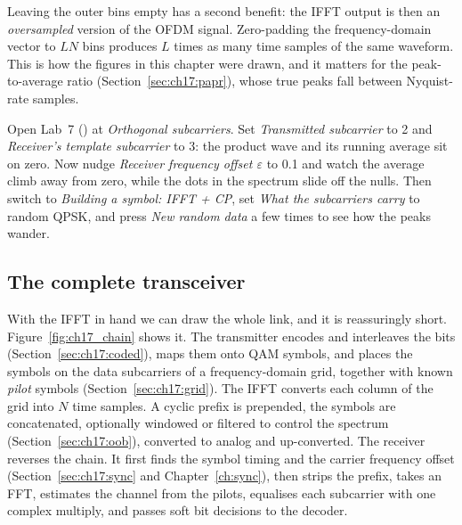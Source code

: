 Leaving the outer bins empty has a second benefit: the IFFT output is then an \emph{oversampled}
version of the OFDM signal. Zero-padding the frequency-domain vector to $LN$ bins produces $L$
times as many time samples of the same waveform. This is how the figures in this chapter were
drawn, and it matters for the peak-to-average ratio (Section~\ref{sec:ch17:papr}), whose true peaks
fall between Nyquist-rate samples.


\begin{tryit}
Open Lab~7 () at \emph{Orthogonal subcarriers}. Set \emph{Transmitted
subcarrier} to 2 and \emph{Receiver's template subcarrier} to 3: the product wave and its
running average sit on zero. Now nudge \emph{Receiver frequency offset $\varepsilon$} to 0.1 and
watch the average climb away from zero, while the dots in the spectrum slide off the nulls.
Then switch to \emph{Building a symbol: IFFT + CP}, set \emph{What the subcarriers carry} to random
QPSK, and press \emph{New random data} a few times to see how the peaks wander.
\end{tryit}

\subsection{The complete transceiver}

With the IFFT in hand we can draw the whole link, and it is reassuringly short.
Figure~\ref{fig:ch17_chain} shows it. The transmitter encodes and interleaves the bits
(Section~\ref{sec:ch17:coded}), maps them onto QAM symbols, and places the symbols on the data
subcarriers of a frequency-domain grid, together with known \emph{pilot} symbols
(Section~\ref{sec:ch17:grid}). The IFFT converts each column of the grid into $N$ time samples. A
cyclic prefix is prepended, the symbols are concatenated, optionally windowed or filtered to
control the spectrum (Section~\ref{sec:ch17:oob}), converted to analog and up-converted. The
receiver reverses the chain. It first finds the symbol timing and the carrier frequency offset
(Section~\ref{sec:ch17:sync} and Chapter~\ref{ch:sync}), then strips the prefix, takes an FFT,
estimates the channel from the pilots, equalises each subcarrier with one complex multiply, and
passes soft bit decisions to the decoder.

